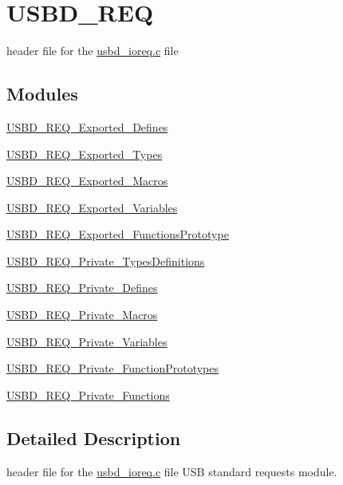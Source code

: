 \hypertarget{group___u_s_b_d___r_e_q}{\section{U\-S\-B\-D\-\_\-\-R\-E\-Q}
\label{group___u_s_b_d___r_e_q}
}


header file for the \hyperlink{usbd__ioreq_8c}{usbd\-\_\-ioreq.\-c} file  


\subsection*{Modules}
\begin{DoxyCompactItemize}
\item 
\hyperlink{group___u_s_b_d___r_e_q___exported___defines}{U\-S\-B\-D\-\_\-\-R\-E\-Q\-\_\-\-Exported\-\_\-\-Defines}
\item 
\hyperlink{group___u_s_b_d___r_e_q___exported___types}{U\-S\-B\-D\-\_\-\-R\-E\-Q\-\_\-\-Exported\-\_\-\-Types}
\item 
\hyperlink{group___u_s_b_d___r_e_q___exported___macros}{U\-S\-B\-D\-\_\-\-R\-E\-Q\-\_\-\-Exported\-\_\-\-Macros}
\item 
\hyperlink{group___u_s_b_d___r_e_q___exported___variables}{U\-S\-B\-D\-\_\-\-R\-E\-Q\-\_\-\-Exported\-\_\-\-Variables}
\item 
\hyperlink{group___u_s_b_d___r_e_q___exported___functions_prototype}{U\-S\-B\-D\-\_\-\-R\-E\-Q\-\_\-\-Exported\-\_\-\-Functions\-Prototype}
\item 
\hyperlink{group___u_s_b_d___r_e_q___private___types_definitions}{U\-S\-B\-D\-\_\-\-R\-E\-Q\-\_\-\-Private\-\_\-\-Types\-Definitions}
\item 
\hyperlink{group___u_s_b_d___r_e_q___private___defines}{U\-S\-B\-D\-\_\-\-R\-E\-Q\-\_\-\-Private\-\_\-\-Defines}
\item 
\hyperlink{group___u_s_b_d___r_e_q___private___macros}{U\-S\-B\-D\-\_\-\-R\-E\-Q\-\_\-\-Private\-\_\-\-Macros}
\item 
\hyperlink{group___u_s_b_d___r_e_q___private___variables}{U\-S\-B\-D\-\_\-\-R\-E\-Q\-\_\-\-Private\-\_\-\-Variables}
\item 
\hyperlink{group___u_s_b_d___r_e_q___private___function_prototypes}{U\-S\-B\-D\-\_\-\-R\-E\-Q\-\_\-\-Private\-\_\-\-Function\-Prototypes}
\item 
\hyperlink{group___u_s_b_d___r_e_q___private___functions}{U\-S\-B\-D\-\_\-\-R\-E\-Q\-\_\-\-Private\-\_\-\-Functions}
\end{DoxyCompactItemize}


\subsection{Detailed Description}
header file for the \hyperlink{usbd__ioreq_8c}{usbd\-\_\-ioreq.\-c} file U\-S\-B standard requests module.